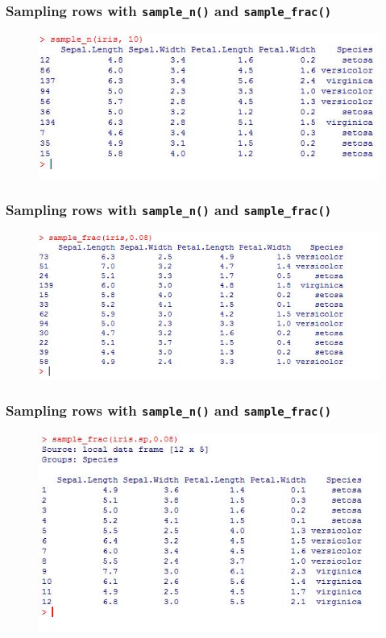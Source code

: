 \documentclass{beamer}
\begin{document}
\begin{frame}
	\frametitle{Sampling rows with \texttt{sample\_n()} and \texttt{sample\_frac()}}
	\LARGE
	
	\begin{figure}
		\centering
		\includegraphics[width=1.07\linewidth]{images/irissample1}
	\end{figure}
	
\end{frame}
\begin{frame}
	\frametitle{Sampling rows with \texttt{sample\_n()} and \texttt{sample\_frac()}}
	
	\begin{figure}
		\centering
		\includegraphics[width=1.07\linewidth]{images/irissample2}
	\end{figure}
	
\end{frame}
\begin{frame}
	\frametitle{Sampling rows with \texttt{sample\_n()} and \texttt{sample\_frac()}}
	
	\begin{figure}
		\centering
		\includegraphics[width=1.07\linewidth]{images/irissample3}
	\end{figure}
	
\end{frame}
\end{document}
